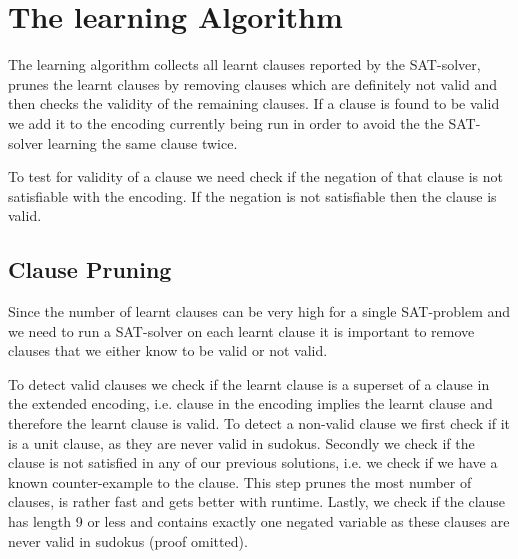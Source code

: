 \documentclass{article}
\begin{document}



\section{The learning Algorithm} \label{algorithm}
The learning algorithm collects all learnt clauses reported by the SAT-solver, prunes the learnt clauses by removing clauses which are definitely not valid and then checks the validity of the remaining clauses. If a clause is found to be valid we add it to the encoding currently being run in order to avoid the the SAT-solver learning the same clause twice.

To test for validity of a clause we need check if the negation of that clause is not satisfiable with the encoding. If the negation is not satisfiable then the clause is valid.
\subsection{Clause Pruning} \label{clause pruning}
Since the number of learnt clauses can be very high for a single SAT-problem and we need to run a SAT-solver on each learnt clause it is important to remove clauses that we either know to be valid or not valid.

To detect valid clauses we check if the learnt clause is a superset of a clause in the extended encoding, i.e. clause in the encoding implies the learnt clause and therefore the learnt clause is valid. To detect a non-valid clause we first check if it is a unit clause, as they are never valid in sudokus. Secondly we check if the clause is not satisfied in any of our previous solutions, i.e. we check if we have a known counter-example to the clause. This step prunes the most number of clauses, is rather fast and gets better with runtime. Lastly, we check if the clause has length 9 or less and contains exactly one negated variable as these clauses are never valid in sudokus (proof omitted).
\end{document}
